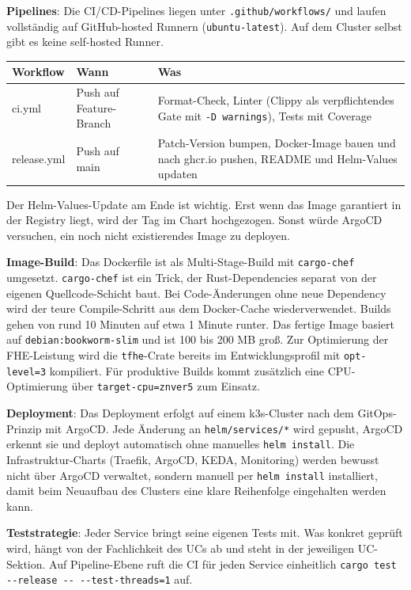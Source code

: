 \textbf{Pipelines}:
Die CI/CD-Pipelines liegen unter \verb|.github/workflows/| und laufen vollständig auf GitHub-hosted Runnern (\verb|ubuntu-latest|). Auf dem Cluster selbst gibt es keine self-hosted Runner.

\begin{tabular}{||l|p{3cm}|p{6cm}||}
    \hline
    \textbf{Workflow} & \textbf{Wann} & \textbf{Was} \\
    \hline\hline
    ci.yml & Push auf Feature-Branch & Format-Check, Linter (Clippy als verpflichtendes Gate mit \verb|-D warnings|), Tests mit Coverage \\
    \hline
    release.yml & Push auf main & Patch-Version bumpen, Docker-Image bauen und nach ghcr.io pushen, README und Helm-Values updaten \\
    \hline
\end{tabular}

Der Helm-Values-Update am Ende ist wichtig. Erst wenn das Image garantiert in der Registry liegt, wird der Tag im Chart hochgezogen. Sonst würde ArgoCD versuchen, ein noch nicht existierendes Image zu deployen.

\textbf{Image-Build}:
Das Dockerfile ist als Multi-Stage-Build mit \verb|cargo-chef| umgesetzt. \verb|cargo-chef| ist ein Trick, der Rust-Dependencies separat von der eigenen Quellcode-Schicht baut. Bei Code-Änderungen ohne neue Dependency wird der teure Compile-Schritt aus dem Docker-Cache wiederverwendet. Builds gehen von rund 10 Minuten auf etwa 1 Minute runter. Das fertige Image basiert auf \verb|debian:bookworm-slim| und ist 100 bis 200 MB groß. Zur Optimierung der FHE-Leistung wird die \verb|tfhe|-Crate bereits im Entwicklungsprofil mit \verb|opt-level=3| kompiliert. Für produktive Builds kommt zusätzlich eine CPU-Optimierung über \verb|target-cpu=znver5| zum Einsatz.

\textbf{Deployment}:
Das Deployment erfolgt auf einem k3s-Cluster nach dem GitOps-Prinzip mit ArgoCD. Jede Änderung an \verb|helm/services/*| wird gepusht, ArgoCD erkennt sie und deployt automatisch ohne manuelles \verb|helm install|. Die Infrastruktur-Charts (Traefik, ArgoCD, KEDA, Monitoring) werden bewusst nicht über ArgoCD verwaltet, sondern manuell per \verb|helm install| installiert, damit beim Neuaufbau des Clusters eine klare Reihenfolge eingehalten werden kann.

\textbf{Teststrategie}:
Jeder Service bringt seine eigenen Tests mit. Was konkret geprüft wird, hängt von der Fachlichkeit des UCs ab und steht in der jeweiligen UC-Sektion. Auf Pipeline-Ebene ruft die CI für jeden Service einheitlich \verb|cargo test --release -- --test-threads=1| auf.

